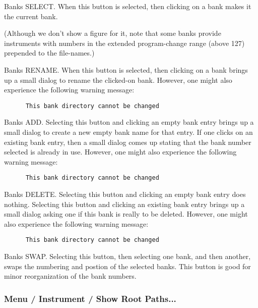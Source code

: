    Banks SELECT.
   When this button is selected, then clicking on a bank makes it the current
   bank.

   (Although we don't show a figure for it, note that some banks provide
   instruments with numbers in the extended program-change range (above
   127) prepended to the file-names.)

   Banks RENAME.
   When this button is selected, then clicking on a bank brings
   up a small dialog to rename the clicked-on bank.
   However, one might also experience the following warning message:

   \begin{verbatim}
      This bank directory cannot be changed
   \end{verbatim}

   Banks ADD.
   Selecting this button and clicking an empty bank entry brings up a small
   dialog to create a new empty bank name for that entry.
   If one clicks on an existing bank entry, then a small dialog comes up
   stating that the bank number selected is already in use.
   However, one might also experience the following warning message:

   \begin{verbatim}
      This bank directory cannot be changed
   \end{verbatim}

   Banks DELETE.
   Selecting this button and clicking an empty bank entry does nothing.
   Selecting this button and clicking an existing bank entry brings up a
   small dialog asking one if this bank is really to be deleted.
   However, one might also experience the following warning message:

   \begin{verbatim}
      This bank directory cannot be changed
   \end{verbatim}

   Banks SWAP.
   Selecting this button, then selecting one bank, and then another,
   swaps the numbering and postion of the selected banks.
   This button is good for minor reorganization of the bank numbers.

\subsubsection{Menu / Instrument / Show Root Paths...}
\label{subsubsec:menu_instrument_show_root_paths}

